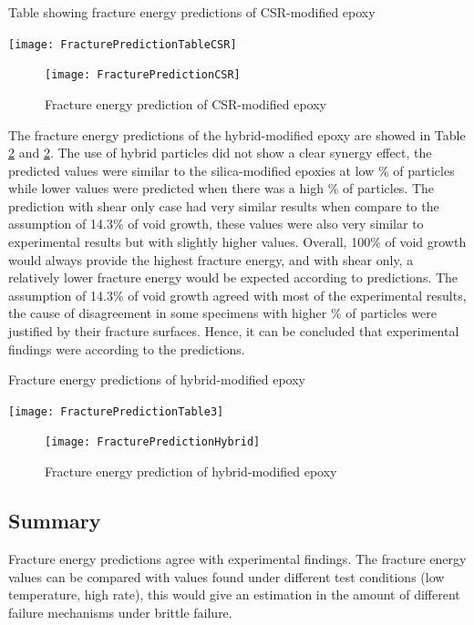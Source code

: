 \documentclass[numbers=noendperiod,chapterprefix=on]{icldt} %
\begin{document}
\begin{table}[!htpb]
\centering
\caption{Table showing fracture energy predictions of CSR-modified epoxy} \label{FracturePredictionTableCSR}
\texttt{[image: FracturePredictionTableCSR]}
\end{table}
\FloatBarrier

\begin{figure}[!htpb]
\centering
\texttt{[image: FracturePredictionCSR]}
\caption{Fracture energy prediction of CSR-modified epoxy} \label{FracturePredictionCSR}
\end{figure}
\FloatBarrier

The fracture energy predictions of the hybrid-modified epoxy are showed in Table \ref{fracturePredictionTable3} and \ref{fracturePredictionTable3}. The use of hybrid particles did not show a clear synergy effect, the predicted values were similar to the silica-modified epoxies at low \% of particles while lower values were predicted when there was a high \% of particles. The prediction with shear only case had very similar results when compare to the assumption of 14.3\% of void growth, these values were also very similar to experimental results but with slightly higher values.
Overall, 100\% of void growth would always provide the highest fracture energy, and with shear only, a relatively lower fracture energy would be expected according to predictions. The assumption of 14.3\% of void growth agreed with most of the experimental results, the cause of disagreement in some specimens with higher \% of particles were justified by their fracture surfaces. Hence, it can be concluded that experimental findings were according to the predictions. 

\begin{table}[!hp]
\centering
\caption{Fracture energy predictions of hybrid-modified epoxy} \label{fracturePredictionTable3}
\texttt{[image: FracturePredictionTable3]}
\end{table}
\FloatBarrier

\begin{figure}[!hp]
\centering
\texttt{[image: FracturePredictionHybrid]}
\caption{Fracture energy prediction of hybrid-modified epoxy} \label{fracturePredictionTable3}
\end{figure}
\FloatBarrier

\subsection{Summary}
Fracture energy predictions agree with experimental findings. The fracture energy values can be compared with values found under different test conditions (low temperature, high rate), this would give an estimation in the amount of different failure mechanisms under brittle failure.
\end{document}
